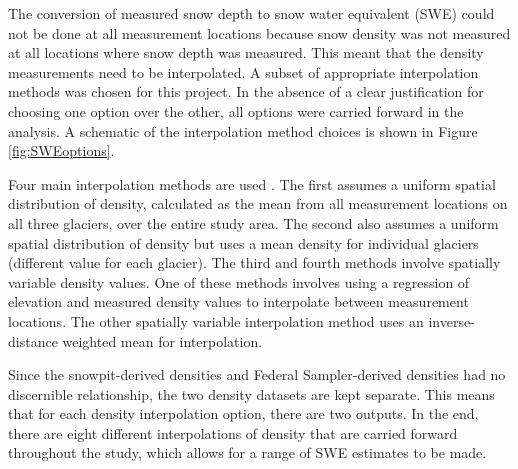 \documentclass{sfuthesis}
\begin{document}
The conversion of measured snow depth to snow water equivalent (SWE) could not be done at all measurement locations because snow density was not measured at all locations where snow depth was measured. This meant that the density measurements need to be interpolated. A subset of appropriate interpolation methods was chosen for this project. In the absence of a clear justification for choosing one option over the other, all options were carried forward in the analysis. A schematic of the interpolation method choices is shown in Figure \ref{fig:SWEoptions}. 

Four main interpolation methods are used \citep{McGrath2015, Elder1991}. The first assumes a uniform spatial distribution of density, calculated as the mean from all measurement locations on all three glaciers, over the entire study area. The second  also assumes a uniform spatial distribution of density but uses a mean density for individual glaciers (different value for each glacier). The third and fourth methods involve spatially variable density values. One of these methods involves using a regression of elevation and measured density values to interpolate between measurement locations. The other spatially variable interpolation method uses an inverse-distance weighted mean for interpolation. 

Since the snowpit-derived densities and Federal Sampler-derived densities had no discernible relationship, the two density datasets are kept separate. This means that for each density interpolation option, there are two outputs. In the end, there are eight different interpolations of density that are carried forward throughout the study, which allows for a range of SWE estimates to be made. 
\end{document}
